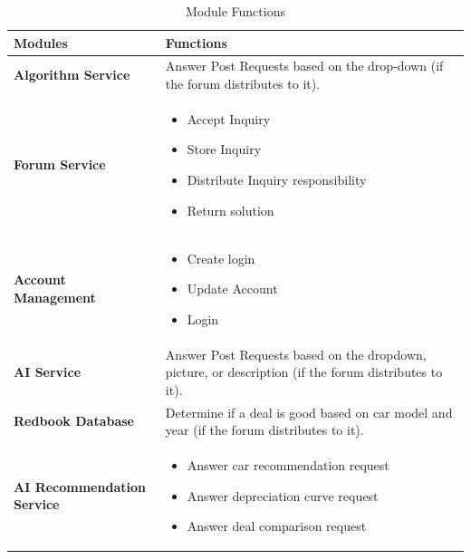 \documentclass[]{article}
\begin{document}
	\begin{table}[h!]
		\centering
		\renewcommand{\arraystretch}{1.5}
		\begin{tabular}{|p{4cm}|p{10cm}|}
			\hline
			\textbf{Modules} & \textbf{Functions} \\
			\hline
			\textbf{Algorithm Service} & Answer Post Requests based on the drop-down (if the forum distributes to it). \\
			\hline
			\textbf{Forum Service} & 
			\begin{itemize}
				\item Accept Inquiry
				\item Store Inquiry
				\item Distribute Inquiry responsibility
				\item Return solution
			\end{itemize} \\
			\hline
			\textbf{Account Management} & 
			\begin{itemize}
				\item Create login
				\item Update Account
				\item Login
			\end{itemize} \\
			\hline
			\textbf{AI Service} & Answer Post Requests based on the dropdown, picture, or description (if the forum distributes to it). \\
			\hline
			\textbf{Redbook Database} & Determine if a deal is good based on car model and year (if the forum distributes to it). \\
			\hline
			\textbf{AI Recommendation Service} & 
			\begin{itemize}
				\item Answer car recommendation request
				\item Answer depreciation curve request
				\item Answer deal comparison request
			\end{itemize} \\
			\hline
		\end{tabular}
		\caption{Module Functions}
		\label{tab:module_functions}
	\end{table}

\pagebreak
\end{document}
